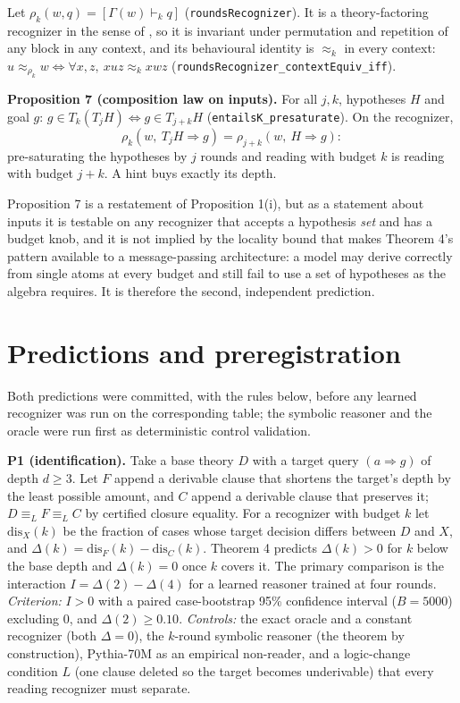 Let \(\rho_k(w,q)=[\Gamma(w)\vdash_kq]\) (\texttt{roundsRecognizer}). It is a theory-factoring recognizer in the sense of \cite{rp2026}, so it is invariant under permutation and repetition of any block in any context, and its behavioural identity is \(\approx_k\) in every context: \(u\approx_{\rho_k}w\iff\forall x,z,\ xuz\approx_kxwz\) (\texttt{roundsRecognizer\_contextEquiv\_iff}).

\textbf{Proposition 7 (composition law on inputs).} For all \(j,k\), hypotheses \(H\) and goal \(g\): \(g\in T_k(T_jH)\iff g\in T_{j+k}H\) (\texttt{entailsK\_presaturate}). On the recognizer, \[\rho_k(w,\ T_jH\Rightarrow g)=\rho_{j+k}(w,\ H\Rightarrow g):\] pre-saturating the hypotheses by \(j\) rounds and reading with budget \(k\) is reading with budget \(j+k\). A hint buys exactly its depth.

Proposition 7 is a restatement of Proposition 1(i), but as a statement about inputs it is testable on any recognizer that accepts a hypothesis \emph{set} and has a budget knob, and it is not implied by the locality bound that makes Theorem 4's pattern available to a message-passing architecture: a model may derive correctly from single atoms at every budget and still fail to use a set of hypotheses as the algebra requires. It is therefore the second, independent prediction.

\section{Predictions and preregistration}\label{predictions-and-preregistration}

Both predictions were committed, with the rules below, before any learned recognizer was run on the corresponding table; the symbolic reasoner and the oracle were run first as deterministic control validation.

\textbf{P1 (identification).} Take a base theory \(D\) with a target query \((a\Rightarrow g)\) of depth \(d\ge3\). Let \(F\) append a derivable clause that shortens the target's depth by the least possible amount, and \(C\) append a derivable clause that preserves it; \(D\equiv_LF\equiv_LC\) by certified closure equality. For a recognizer with budget \(k\) let \(\mathrm{dis}_X(k)\) be the fraction of cases whose target decision differs between \(D\) and \(X\), and \(\Delta(k)=\mathrm{dis}_F(k)-\mathrm{dis}_C(k)\). Theorem 4 predicts \(\Delta(k)>0\) for \(k\) below the base depth and \(\Delta(k)=0\) once \(k\) covers it. The primary comparison is the interaction \(I=\Delta(2)-\Delta(4)\) for a learned reasoner trained at four rounds. \emph{Criterion:} \(I>0\) with a paired case-bootstrap 95\% confidence interval (\(B=5000\)) excluding \(0\), and \(\Delta(2)\ge0.10\). \emph{Controls:} the exact oracle and a constant recognizer (both \(\Delta=0\)), the \(k\)-round symbolic reasoner (the theorem by construction), Pythia-70M as an empirical non-reader, and a logic-change condition \(L\) (one clause deleted so the target becomes underivable) that every reading recognizer must separate.

